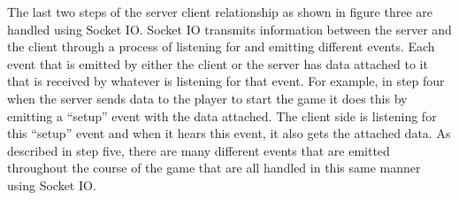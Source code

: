 The last two steps of the server client relationship as shown in
figure three are handled using Socket IO. Socket IO transmits
information between the server and the client through a process of
listening for and emitting different events. Each event that is
emitted by either the client or the server has data attached to it
that is received by whatever is listening for that event. For example,
in step four when the server sends data to the player to start the
game it does this by emitting a “setup” event with the data
attached. The client side is listening for this “setup” event and when
it hears this event, it also gets the attached data. As described in
step five, there are many different events that are emitted throughout
the course of the game that are all handled in this same manner using
Socket IO.
